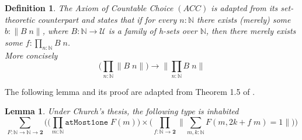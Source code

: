 \documentclass[12pt]{report}
\newtheorem{lem}[thm]{Lemma}
\newtheorem{defn}[thm]{Definition}
\theoremstyle{definition}
\begin{document}
\begin{defn}
The Axiom of Countable Choice $(ACC)$ is adapted from its set-theoretic counterpart and states that if for every $n : \mathbb{N}$ there exists (merely) some $b : \lVert B\; n \rVert$, where $B : \mathbb{N} \rightarrow \mathcal{U}$ is a family of h-sets over $\mathbb{N}$, then there merely exists some $f : \prod_{n : \mathbb{N}} B\; n$.\\
More concisely
$$\Big(\prod_{n : \mathbb{N}} \big\lVert B\; n \big\rVert\Big) \rightarrow \Big\lVert \prod_{n : \mathbb{N}} B\; n \Big\rVert$$
\end{defn}
The following lemma and its proof are adapted from Theorem 1.5 of \cite{bridges_richman_1987_1}. 
\begin{lem}\label{405}
Under Church's thesis, the following type is inhabited
$$\sum_{F : \mathbb{N} \rightarrow \mathbb{N} \rightarrow \mathbf{2}} \Big( \big(\prod_{m : \mathbb{N}} \mathtt{atMost1one}\; F(m) \big) \times \big( \prod_{f : \mathbb{N} \rightarrow \mathbf{2}} \big\lVert \sum_{m, k : \mathbb{N}} F(m, 2k+ f\; m) = 1 \big\rVert \big) \Big)$$
\end{lem}
\end{document}
